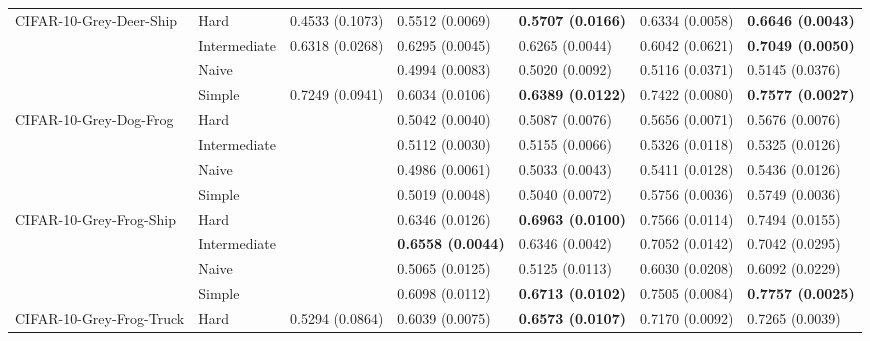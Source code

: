 \begin{tabular}{lllllll}
CIFAR-10-Grey-Deer-Ship & Hard &  0.4533 (0.1073) &           0.5512 (0.0069) &  \textbf{0.5707 (0.0166)} &           0.6334 (0.0058) &  \textbf{0.6646 (0.0043)} \\
                 & Intermediate &  0.6318 (0.0268) &           0.6295 (0.0045) &           0.6265 (0.0044) &           0.6042 (0.0621) &  \textbf{0.7049 (0.0050)} \\
                 & Naive &                  &           0.4994 (0.0083) &           0.5020 (0.0092) &           0.5116 (0.0371) &           0.5145 (0.0376) \\
                 & Simple &  0.7249 (0.0941) &           0.6034 (0.0106) &  \textbf{0.6389 (0.0122)} &           0.7422 (0.0080) &  \textbf{0.7577 (0.0027)} \\
CIFAR-10-Grey-Dog-Frog & Hard &                  &           0.5042 (0.0040) &           0.5087 (0.0076) &           0.5656 (0.0071) &           0.5676 (0.0076) \\
                 & Intermediate &                  &           0.5112 (0.0030) &           0.5155 (0.0066) &           0.5326 (0.0118) &           0.5325 (0.0126) \\
                 & Naive &                  &           0.4986 (0.0061) &           0.5033 (0.0043) &           0.5411 (0.0128) &           0.5436 (0.0126) \\
                 & Simple &                  &           0.5019 (0.0048) &           0.5040 (0.0072) &           0.5756 (0.0036) &           0.5749 (0.0036) \\
CIFAR-10-Grey-Frog-Ship & Hard &                  &           0.6346 (0.0126) &  \textbf{0.6963 (0.0100)} &           0.7566 (0.0114) &           0.7494 (0.0155) \\
                 & Intermediate &                  &  \textbf{0.6558 (0.0044)} &           0.6346 (0.0042) &           0.7052 (0.0142) &           0.7042 (0.0295) \\
                 & Naive &                  &           0.5065 (0.0125) &           0.5125 (0.0113) &           0.6030 (0.0208) &           0.6092 (0.0229) \\
                 & Simple &                  &           0.6098 (0.0112) &  \textbf{0.6713 (0.0102)} &           0.7505 (0.0084) &  \textbf{0.7757 (0.0025)} \\
CIFAR-10-Grey-Frog-Truck & Hard &  0.5294 (0.0864) &           0.6039 (0.0075) &  \textbf{0.6573 (0.0107)} &           0.7170 (0.0092) &           0.7265 (0.0039) \\

\end{tabular}
